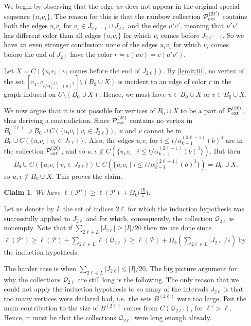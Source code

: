 \documentclass[a4paper,11pt]{article}
\makeatletter
\renewenvironment{proof}[1][\proofname] {\par\pushQED{\qed}\normalfont\topsep6\p@\@plus6\p@\relax\trivlist\item[\hskip\labelsep\bfseries#1\@addpunct{.}]\ignorespaces}{\popQED\endtrivlist\@endpefalse}
\newtheorem{claim}[theorem]{\bf Claim}
\theoremstyle{definition}
\def\cP{\mathcal{P}}
\def\cQ{\mathcal{Q}}
\makeatother
\begin{document}
\begin{proof}
\begin{proof}
We begin by observing that the edge $uv$ does not appear in the original special sequence $\{u_iv_i\}$. The reason for this is that the rainbow collection $\cP^{(2\ell')}_{\rm ext}$ contains both the edges $u_iv_i$ for $v_i\in J_{2\ell-1}\cup J_{2\ell}$ and the edge $u'v'$, meaning that $u'v'$ has different color than all edges $\{u_iv_i\}$ for which $v_i$ comes before $J_{2\ell'-1}$. So we have an even stronger conclusion: none of the edges $u_iv_i$ for which $v_i$ comes before the end of $J_{2\ell}$ have the color $r=c(uv)=c(u'v')$.

Let $X=C(\{u_iv_i\mid v_i\text{ comes before the end of }J_{2\ell}\})$.
By \cref{lemit:iii}, no vertex of the set $[v_1, v_{t/\alpha_{k-1}^{(2\ell)}(a)^3}]\setminus (B_0\cup X)$ is incident to an edge of color $r$ in the graph induced on $U\setminus (B_0\cup X)$. Hence, we must have $u\in B_0\cup X$ or $v\in B_0\cup X$. 

We now argue that it is not possible for vertices of $B_0\cup X$ to be a part of $\cP^{(2\ell)}_{\rm ext}$, thus deriving a contradiction. 
Since $\cP^{(2\ell)}_{\rm ext}$ contains no vertex in $B_0^{(2\ell)}\supseteq B_0 \cup C(\{u_iv_i\mid v_i\in J_{2\ell}\})$, $u$ and $v$ cannot be in $B_0 \cup C(\{u_iv_i\mid v_i\in J_{2\ell}\})$. Also, the edges $u_iv_i$ for $i\leq t/\alpha_{k-1}^{(2\ell-1)}(b)^3$ are in the collection $\cP^{(2\ell)}_{\rm ext}$, and so $u, v\notin C(\{u_iv_i\mid i\leq t/\alpha_{k-1}^{(2\ell-1)}(b)^3\})$. But then 
\[B_0 \cup C(\{u_iv_i\mid v_i\in J_{2\ell}\})\cup C(\{u_iv_i\mid i\leq t/\alpha_{k-1}^{(2\ell-1)}(b)^3\})=B_0\cup X,\]
so $u, v\notin B_0\cup X$. This proves the claim.
\end{proof}

\begin{claim}
We have $\ell(\cP')\geq \ell(\cP)+\Omega_k\Big(\frac{|I|}{s}\Big)$.
\end{claim}
\begin{proof}
Let us denote by $L$ the set of indices $2\ell$ for which the induction hypothesis was successfully applied to $J_{2\ell}$ and for which, consequently, the collection $\cQ_{2\ell}$ is nonempty.  Note that if $\sum_{2\ell\in L}|J_{2\ell}|\geq |I|/20$ then we are done since $\ell(\cP')\geq \ell(\cP)+\sum_{2\ell\in L}\ell(\cQ_{2\ell})\geq \ell(\cP)+\Omega_k(\sum_{2\ell\in L}|J_{2\ell}|/s)$ by the induction hypothesis. 

The harder case is when $\sum_{2\ell\in L}|J_{2\ell}|\leq |I|/20$. The big picture argument for why the collections $\cQ_{2\ell}$ are still long is the following. The only reason that we could not apply the induction hypothesis to so many of the intervals $J_{2\ell}$ is that too many vertices were declared bad, i.e.\ the sets $B^{(2\ell)}$ were too large. But the main contribution to the size of $B^{(2\ell)}$ comes from $C(\cQ_{2\ell'})$, for $\ell'>\ell$. Hence, it must be that the collections $\cQ_{2\ell'}$ were long enough already.


\end{proof}
\end{proof}
\end{document}
